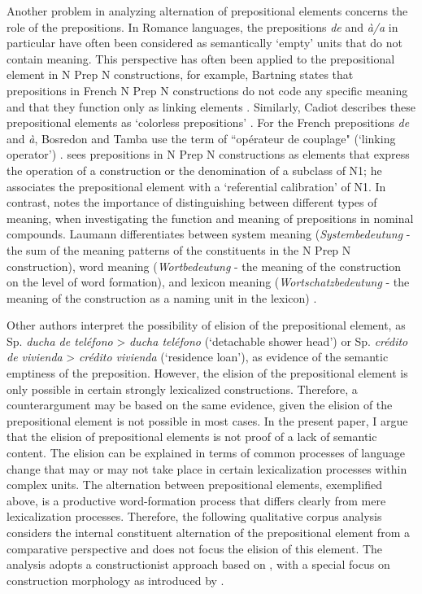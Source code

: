 \documentclass[output=paper]{langsci/langscibook}
\begin{document}
Another problem in analyzing alternation of prepositional elements concerns the role of the prepositions. In Romance languages, the prepositions \textit{de} and \textit{à/a} in particular have often been considered as semantically `empty' units that do not contain meaning. This perspective has often been applied to the prepositional element in N Prep N constructions, for example, Bartning states that prepositions in French N Prep N constructions do not code any specific meaning and that they function only as linking elements \citep[164]{Bartning:1993}. Similarly, Cadiot describes these prepositional elements as `colorless prepositions' \citep[164]{Bartning:1993}. For the French prepositions \textit{de} and \textit{à}, Bosredon and Tamba use the term of ``opérateur de couplage" (`linking operator') \citep[44]{Bosredon:1991}. \citet{Cadiot:1997} sees prepositions in N Prep N constructions as elements that express the operation of a construction or the denomination of a subclass of N1; he associates the prepositional element with a `referential calibration' of N1. In contrast, \citet{Laumann:1998} notes the importance of distinguishing between different types of meaning, when investigating the function and meaning of prepositions in nominal compounds. Laumann differentiates between system meaning (\textit{Systembedeutung} - the sum of the meaning patterns of the constituents in the N Prep N construction), word meaning (\textit{Wortbedeutung} - the meaning of the construction on the level of word formation), and lexicon meaning (\textit{Wortschatzbedeutung} - the meaning of the construction as a naming unit in the lexicon) \citep[32]{Laumann:1998}.

Other authors interpret the possibility of elision of the prepositional element, as Sp. \textit{ducha de teléfono}  > \textit{ducha teléfono} (`detachable shower head') or Sp.  \textit{crédito de vivienda} > \textit{crédito  vivienda} (`residence loan'), as evidence of the semantic emptiness of the preposition. However, the elision of the prepositional element is only possible in certain strongly lexicalized constructions. Therefore, a counterargument may be based on the same evidence, given the elision of the prepositional element is not possible in most cases. In the present paper, I argue that the elision of prepositional elements is not proof of a lack of semantic content. The elision can be explained in terms of common processes of language change that may or may not take place in certain lexicalization processes within complex units. The alternation between prepositional elements, exemplified above, is a productive word-formation process that differs clearly from mere lexicalization processes. Therefore, the following qualitative corpus analysis considers the internal constituent alternation of the prepositional element from a comparative perspective and does not focus the elision of this element. The analysis adopts a constructionist approach based on \citet{Goldberg:1995,Goldberg:2006}, with a special focus on construction morphology as introduced by \citet{Booij:2010,Booij:2015}.
\end{document}
